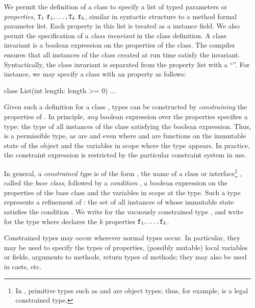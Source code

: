 We permit the definition of a class  to specify
a list of typed parameters or {\em properties},
${\tt T}_1~{\tt f}_1, \dots, {\tt T}_k~{\tt f}_k$,
similar in syntactic structure to a method formal parameter list.
%
Each property in this list is treated as  a   instance field.
%
We also permit the
specification of a {\em class invariant}
in the class definition. A class invariant
is a boolean expression on the properties of the class.
The compiler ensures that all
instances of the class created at run time satisfy the invariant.
%
Syntactically, the class invariant is separated from the
property list with a ``\xcd{:}''. 
%
For instance, we may specify a class  with an
 property as follows:
\begin{xten}
class List(int length: length >= 0) {...}
\end{xten}
Given such a definition for a class , types can be
constructed by {\em constraining} the properties of .  In
principle, {\em any} boolean expression over the properties
specifies a type: the type of all instances of the class
satisfying the boolean expression. Thus, 
is a permissible type, as are  and
even  where  and 
are functions on the immutable state of the  object
and the variables in scope where the type appears.
In practice, the constraint expression is restricted by the
particular constraint system in use.

In general, a {\em constrained type} is of the form ,
the name of a class or interface\footnote{In \Xten{}, primitive
types such as  and  are object types; thus,
for example,  is a legal constrained type.}
, called the {\em base class}, followed
by a {\em condition} ,
a boolean expression on the properties of the
base class and the  variables in scope at the type.
Such a type represents a refinement of : the set of all
instances of  whose immutable state satisfies the
condition .
%
We write  for 
the vacuously constrained type , and
write
 for
the type
where  declares the $k$ properties
${\tt f}_1,\ldots,{\tt f}_k$.

Constrained types may occur wherever normal types occur. In
particular, they may be used to specify the types of properties,
(possibly mutable) local variables or fields,
arguments to methods, return types of methods; they may also be
used in casts, etc.

